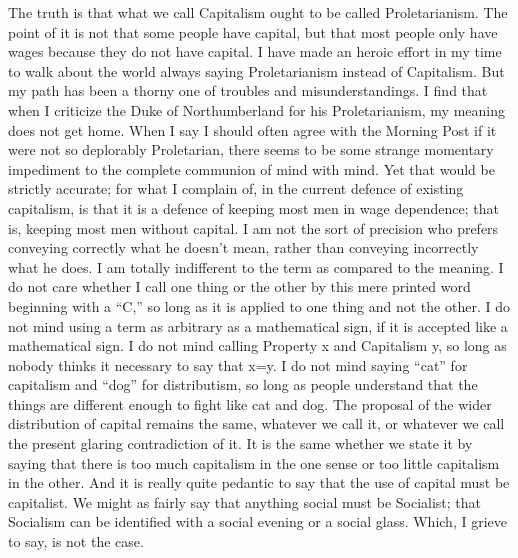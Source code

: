 \documentclass{book}
\begin{document}
The truth is that what we call Capitalism ought to be called Proletarianism. The point of it is not that some people have capital, but that most people only have wages because they do not have capital. I have made an heroic effort in my time to walk about the world always saying Proletarianism instead of Capitalism. But my path has been a thorny one of troubles and misunderstandings. I find that when I criticize the Duke of Northumberland for his Proletarianism, my meaning does not get home. When I say I should often agree with the Morning Post if it were not so deplorably Proletarian, there seems to be some strange momentary impediment to the complete communion of mind with mind. Yet that would be strictly accurate; for what I complain of, in the current defence of existing capitalism, is that it is a defence of keeping most men in wage dependence; that is, keeping most men without capital. I am not the sort of precision who prefers conveying correctly what he doesn’t mean, rather than conveying incorrectly what he does. I am totally indifferent to the term as compared to the meaning. I do not care whether I call one thing or the other by this mere printed word beginning with a “C,” so long as it is applied to one thing and not the other. I do not mind using a term as arbitrary as a mathematical sign, if it is accepted like a mathematical sign. I do not mind calling Property x and Capitalism y, so long as nobody thinks it necessary to say that x=y. I do not mind saying “cat” for capitalism and “dog” for distributism, so long as people understand that the things are different enough to fight like cat and dog. The proposal of the wider distribution of capital remains the same, whatever we call it, or whatever we call the present glaring contradiction of it. It is the same whether we state it by saying that there is too much capitalism in the one sense or too little capitalism in the other. And it is really quite pedantic to say that the use of capital must be capitalist. We might as fairly say that anything social must be Socialist; that Socialism can be identified with a social evening or a social glass. Which, I grieve to say, is not the case.
\end{document}
